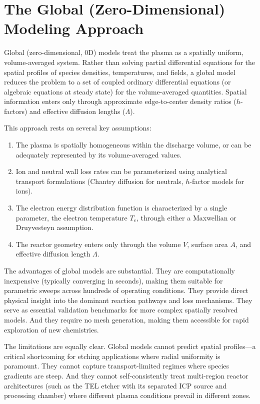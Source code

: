 \documentclass[11pt,a4paper]{report}
\newcommand{\Te}{T_e}
\begin{document}
\section{The Global (Zero-Dimensional) Modeling Approach}
\label{sec:intro_global}

Global (zero-dimensional, 0D) models treat the plasma as a spatially uniform, volume-averaged system.  Rather than solving partial differential equations for the spatial profiles of species densities, temperatures, and fields, a global model reduces the problem to a set of coupled ordinary differential equations (or algebraic equations at steady state) for the volume-averaged quantities.  Spatial information enters only through approximate edge-to-center density ratios ($h$-factors) and effective diffusion lengths ($\Lambda$).

This approach rests on several key assumptions:
\begin{enumerate}[nosep]
    \item The plasma is spatially homogeneous within the discharge volume, or can be adequately represented by its volume-averaged values.
    \item Ion and neutral wall loss rates can be parameterized using analytical transport formulations (Chantry diffusion for neutrals, $h$-factor models for ions).
    \item The electron energy distribution function is characterized by a single parameter, the electron temperature $\Te$, through either a Maxwellian or Druyvesteyn assumption.
    \item The reactor geometry enters only through the volume $V$, surface area $A$, and effective diffusion length $\Lambda$.
\end{enumerate}

The advantages of global models are substantial.  They are computationally inexpensive (typically converging in seconds), making them suitable for parametric sweeps across hundreds of operating conditions.  They provide direct physical insight into the dominant reaction pathways and loss mechanisms.  They serve as essential validation benchmarks for more complex spatially resolved models.  And they require no mesh generation, making them accessible for rapid exploration of new chemistries.

The limitations are equally clear.  Global models cannot predict spatial profiles---a critical shortcoming for etching applications where radial uniformity is paramount.  They cannot capture transport-limited regimes where species gradients are steep.  And they cannot self-consistently treat multi-region reactor architectures (such as the TEL etcher with its separated ICP source and processing chamber) where different plasma conditions prevail in different zones.
\end{document}
